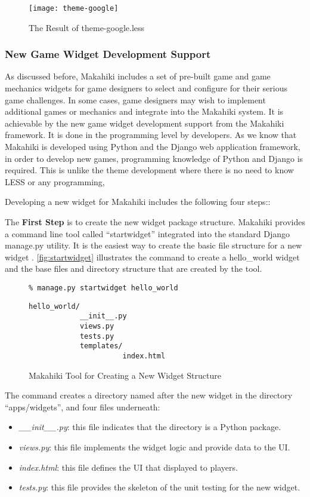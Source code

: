 \begin{figure}[!ht]
  \center
  \texttt{[image: theme-google]}
  \caption{The Result of theme-google.less}
  \label{fig:theme-google-test}
\end{figure}

\clearpage

\subsubsection{New Game Widget Development Support}

As discussed before, Makahiki includes a set of pre-built game and game mechanics widgets for game designers to select and configure for their serious game challenges. In some cases, game designers may wish to implement additional games or mechanics and integrate into the Makahiki system. It is achievable by the new game widget development support from the Makahiki framework. It is done in the programming level by developers. As we know that Makahiki is developed using Python and the Django web application framework, in order to develop new games, programming knowledge of Python and Django is required. This is unlike the theme development where there is no need to know LESS or any programming, 

Developing a new widget for Makahiki includes the following four steps::

The {\bf First Step} is to create the new widget package structure. Makahiki provides a command line tool called ``startwidget'' integrated into the standard Django manage.py utility. It is the easiest way to create the basic file structure for a new widget . \autoref{fig:startwidget} illustrates the command to create a hello\_world widget and the base files and directory structure that are created by the tool. 

\begin{figure}[!ht]
\begin{lstlisting}
% manage.py startwidget hello_world
\end{lstlisting}
\begin{lstlisting}
hello_world/
            __init__.py
            views.py
            tests.py
            templates/
                      index.html
\end{lstlisting}
\caption{Makahiki Tool for Creating a New Widget Structure}
\label{fig:startwidget}
\end{figure}

The command creates a directory named after the new widget in the directory ``apps/widgets'', and four files underneath:
\begin{itemize}
\item {\em \_\_init\_\_.py}: this file indicates that the directory is a Python package.
\item {\em views.py}: this file implements the widget logic and provide data to the UI.
\item {\em index.html}: this file defines the UI that displayed to players.
\item {\em tests.py}: this file provides the skeleton of the unit testing for the new widget.
\end{itemize}

